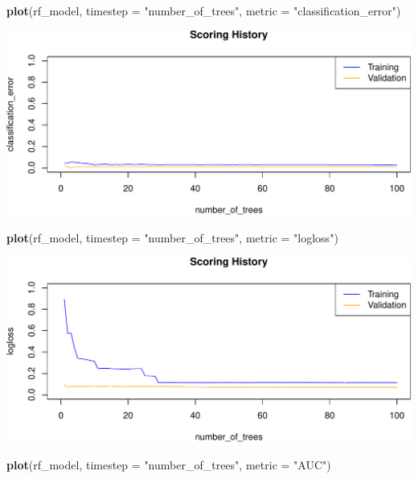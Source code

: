 \documentclass[]{article}
\newenvironment{Shaded}{\begin{snugshade}}{\end{snugshade}}
\newcommand{\KeywordTok}[1]{\textcolor[rgb]{0.13,0.29,0.53}{\textbf{{#1}}}}
\newcommand{\DataTypeTok}[1]{\textcolor[rgb]{0.13,0.29,0.53}{{#1}}}
\newcommand{\StringTok}[1]{\textcolor[rgb]{0.31,0.60,0.02}{{#1}}}
\newcommand{\NormalTok}[1]{{#1}}
\begin{document}
\begin{Shaded}
\begin{Highlighting}[]
\KeywordTok{plot}\NormalTok{(rf_model,}
     \DataTypeTok{timestep =} \StringTok{"number_of_trees"}\NormalTok{,}
     \DataTypeTok{metric =} \StringTok{"classification_error"}\NormalTok{)}
\end{Highlighting}
\end{Shaded}

\begin{center}\includegraphics{webinar_code_files/figure-latex/unnamed-chunk-53-1} \end{center}

\begin{Shaded}
\begin{Highlighting}[]
\KeywordTok{plot}\NormalTok{(rf_model,}
     \DataTypeTok{timestep =} \StringTok{"number_of_trees"}\NormalTok{,}
     \DataTypeTok{metric =} \StringTok{"logloss"}\NormalTok{)}
\end{Highlighting}
\end{Shaded}

\begin{center}\includegraphics{webinar_code_files/figure-latex/unnamed-chunk-54-1} \end{center}

\begin{Shaded}
\begin{Highlighting}[]
\KeywordTok{plot}\NormalTok{(rf_model,}
     \DataTypeTok{timestep =} \StringTok{"number_of_trees"}\NormalTok{,}
     \DataTypeTok{metric =} \StringTok{"AUC"}\NormalTok{)}
\end{Highlighting}
\end{Shaded}
\end{document}
